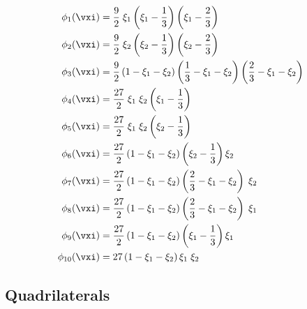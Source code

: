 \begin{align}
 \phi_1(\vxi) & = \frac{9}{2} \; \xi_1 
                  \left(\xi_1 - \frac{1}{3} \right)
		  \left(\xi_1 - \frac{2}{3} \right) \\
 \phi_2(\vxi) & = \frac{9}{2} \; \xi_2 
                  \left(\xi_2 - \frac{1}{3} \right) 
		  \left(\xi_2 - \frac{2}{3} \right) \\
 \phi_3(\vxi) & = \frac{9}{2} 
                  \left( 1 - \xi_1 - \xi_2 \right) 
                  \left( \frac{1}{3} - \xi_1 - \xi_2 \right) 
		  \left( \frac{2}{3} - \xi_1 - \xi_2 \right) \\
 \phi_4(\vxi) & = \frac{27}{2} \; \xi_1 \; \xi_2 
                  \left( \xi_1 - \frac{1}{3} \right) \\
 \phi_5(\vxi) & = \frac{27}{2} \; \xi_1 \; \xi_2 
                  \left( \xi_2 - \frac{1}{3} \right) \\
 \phi_6(\vxi) & = \frac{27}{2} 
                  \left(1 - \xi_1 - \xi_2\right) 
		  \left( \xi_2 - \frac{1}{3} \right) \xi_2 \\
 \phi_7(\vxi) & = \frac{27}{2}
                  \left( 1 - \xi_1 - \xi_2 \right)
		  \left( \frac{2}{3} - \xi_1 - \xi_2 \right) \; \xi_2 \\
 \phi_8(\vxi) & = \frac{27}{2} 
                  \left( 1 - \xi_1 - \xi_2 \right) 
		  \left( \frac{2}{3} - \xi_1 - \xi_2 \right) \; \xi_1 \\
 \phi_9(\vxi) & = \frac{27}{2}
                  \left(1 - \xi_1 - \xi_2\right)
		  \left( \xi_1 - \frac{1}{3} \right) \xi_1 \\
 \phi_{10}(\vxi) & = 27 \left( 1 - \xi_1 - \xi_2 \right ) \xi_1 \; \xi_2
\end{align}


\clearpage
\subsection{Quadrilaterals}

